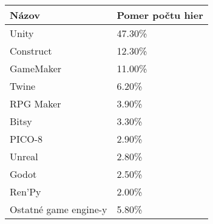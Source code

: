 \documentclass[10pt,oneside,slovak,a4paper,hidelinks]{article}
\begin{document}
	\begin{center}
		\begin{tabular}{|p{5cm}|p{5cm}|}
			\hline
			Názov & Pomer počtu hier\\
			\hline\hline
			Unity		& 47.30\%\\
			Construct	& 12.30\%\\
			GameMaker	& 11.00\%\\
			Twine		& 6.20\%\\
			RPG Maker	& 3.90\%\\
			Bitsy		& 3.30\%\\
			PICO-8		& 2.90\%\\
			Unreal		& 2.80\%\\
			Godot		& 2.50\%\\
			Ren'Py		& 2.00\%\\
			Ostatné game engine-y	& 5.80\%\\
			\hline
		\end{tabular}
	\end{center}
\end{document}
